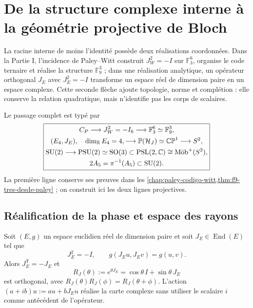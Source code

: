 \section{De la structure complexe interne à la géométrie projective de Bloch}
\label{sec:geometria-proyectiva-bloch-rev2}

La racine interne de moins l'identité possède deux réalisations coordonnées. Dans
la Partie I, l'incidence de Paley--Witt construit
\(J_W^2=-I\) sur \(\mathbb F_3^6\), organise le code ternaire et réalise
la structure \(\mathbb F_9^3\) ; dans une réalisation analytique, un opérateur
orthogonal \(J_E\) avec \(J_E^2=-I\) transforme un espace réel de dimension
paire en un espace complexe. Cette seconde flèche ajoute topologie, norme et
complétion : elle conserve la relation quadratique, mais n'identifie pas les corps
de scalaires.

Le passage complet est typé par
\begin{equation}
 \boxed{
 \begin{gathered}
 C_P\longrightarrow J_W^2=-I_6
 \longrightarrow \mathbb F_3^6\simeq\mathbb F_9^3,\\
 (E_4,J_E),\quad \dim_{\mathbb R}E_4=4,
 \longrightarrow
 \mathbb P(\mathcal H_J)\simeq\mathbb {CP}^{1}
 \longrightarrow S^2,\\
 \mathrm{SU}(2)\longrightarrow\mathrm{PSU}(2)\simeq\mathrm{SO}(3)
 \subset\mathrm{PSL}(2,\mathbb C)\cong\text{\rmfamily Möb}^{+}(S^2),\\
 2A_5=\pi^{-1}(A_5)\subset\mathrm{SU}(2).
 \end{gathered}}
 \label{eq:cadena-paley-bloch-rev2}
\end{equation}
La première ligne conserve ses preuves dans les
\cref{chap:paley-codigo-witt,thm:f9-tres-desde-paley} ; on construit ici les
deux lignes projectives.

\subsection{Réalification de la phase et espace des rayons}

Soit \((E,g)\) un espace euclidien réel de dimension paire et soit
\(J_E\in\operatorname{End}(E)\) tel que
\[
 J_E^2=-I,
 \qquad g(J_Eu,J_Ev)=g(u,v).
\]
Alors \(J_E^{\mathsf T}=-J_E\) et
\[
 R_J(\theta):=e^{\theta J_E}
 =\cos\theta\,I+\sin\theta\,J_E
\]
est orthogonal, avec
\(R_J(\theta)R_J(\phi)=R_J(\theta+\phi)\). L'action
\((a+ib)u:=au+bJ_Eu\) réalise la carte complexe sans utiliser le scalaire
\(i\) comme antécédent de l'opérateur.

